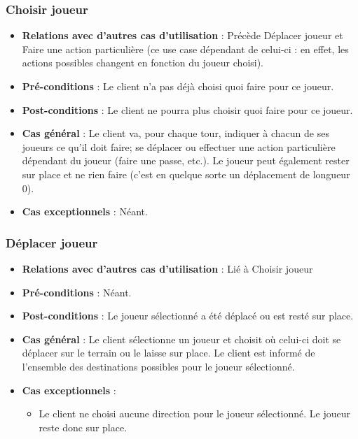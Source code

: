 \documentclass[a4paper,titlepage]{scrreprt}
\begin{document}
    \subsubsection{Choisir joueur}
      \begin{itemize}
        \item \textbf{Relations avec d'autres cas d'utilisation}  : Précède Déplacer joueur et Faire une action particulière (ce use case dépendant de celui-ci : en effet, les actions possibles changent en fonction du joueur choisi).
        \item \textbf{Pré-conditions} : Le client n'a pas déjà choisi quoi faire pour ce joueur.
        \item \textbf{Post-conditions} : Le client ne pourra plus choisir quoi faire pour ce joueur.
        \item \textbf{Cas général} : Le client va, pour chaque tour, indiquer à chacun de ses joueurs ce qu'il doit faire; se déplacer ou effectuer une action particulière dépendant du joueur (faire une passe, etc.). Le joueur peut également rester sur place et ne rien faire (c'est en quelque sorte un déplacement de longueur 0).
        \item \textbf{Cas exceptionnels} : Néant.
      \end{itemize}

    \subsubsection{Déplacer joueur}
      \begin{itemize}
        \item \textbf{Relations avec d'autres cas d'utilisation}  : Lié à Choisir joueur
        \item \textbf{Pré-conditions} : Néant.
        \item \textbf{Post-conditions} : Le joueur sélectionné a été déplacé ou est resté sur place.
        \item \textbf{Cas général} : Le client sélectionne un joueur et choisit où celui-ci doit se déplacer sur le terrain ou le laisse sur place. Le client est informé de l’ensemble des destinations possibles pour le joueur sélectionné.
        \item \textbf{Cas exceptionnels} : 
        \begin{itemize}
            \item Le client ne choisi aucune direction pour le joueur sélectionné. Le joueur reste donc sur place.
          \end{itemize}
      \end{itemize}
\end{document}
